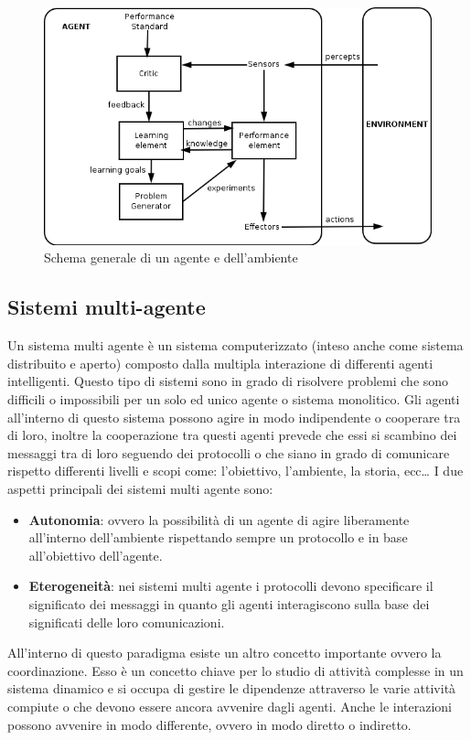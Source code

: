 \documentclass[11pt]{article}
\begin{document}
\begin{figure}[H]
    \includegraphics[width=16cm]{resources/schema_agente.png}
    \caption{Schema generale di un agente e dell'ambiente} 
\end{figure}

\subsection{Sistemi multi-agente}
Un sistema multi agente è un sistema computerizzato (inteso anche come sistema distribuito e aperto) composto dalla multipla interazione di differenti agenti intelligenti. Questo tipo di sistemi sono in grado di risolvere problemi che sono difficili o impossibili per un solo ed unico agente o sistema monolitico.
Gli agenti all'interno di questo sistema possono agire in modo indipendente o cooperare tra di loro, inoltre la cooperazione tra questi agenti prevede che essi si scambino dei messaggi tra di loro seguendo dei protocolli o che siano in grado di comunicare rispetto differenti livelli e scopi come: l'obiettivo, l'ambiente, la storia, ecc…
I due aspetti principali dei sistemi multi agente sono:
\begin{itemize}
    \item \textbf{Autonomia}: ovvero la possibilità di un agente di agire liberamente all'interno dell'ambiente rispettando sempre un protocollo e in base all'obiettivo dell'agente.
    \item \textbf{Eterogeneità}: nei sistemi multi agente i protocolli devono specificare il significato dei messaggi in quanto gli agenti interagiscono sulla base dei significati delle loro comunicazioni.
\end{itemize}

All'interno di questo paradigma esiste un altro concetto importante ovvero la coordinazione. Esso è un concetto chiave per lo studio di attività complesse in un sistema dinamico e si occupa di gestire le dipendenze attraverso le varie attività compiute o che devono essere ancora avvenire dagli agenti.
Anche le interazioni possono avvenire in modo differente, ovvero in modo diretto o indiretto.
\end{document}
